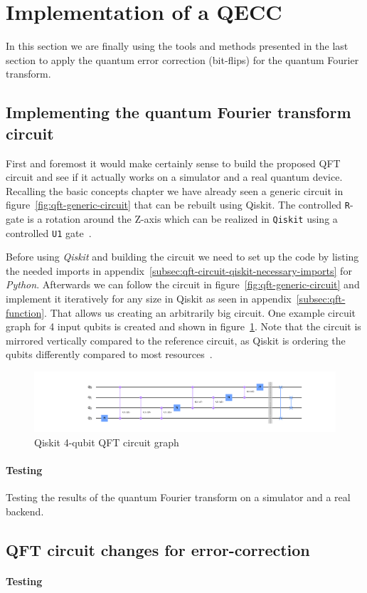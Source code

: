\section{Implementation of a QECC}
\label{sec:implementation}

In this section we are finally using the tools and methods presented in the last section to apply the quantum error correction (bit-flips) for the quantum Fourier transform.

\subsection{Implementing the quantum Fourier transform circuit}
\label{subsec:implementing-quantum-fourier-transform-circuit}

First and foremost it would make certainly sense to build the proposed QFT circuit and see if it actually works on a simulator and a real quantum device.
Recalling the basic concepts chapter we have already seen a generic circuit in figure~\ref{fig:qft-generic-circuit} that can be rebuilt using Qiskit.
The controlled \texttt{R}-gate is a rotation around the Z-axis which can be realized in \texttt{Qiskit} using a controlled \texttt{U1} gate~\cite{ControlledU1Gate}.

Before using \emph{Qiskit} and building the circuit we need to set up the code by listing the needed imports in appendix~\ref{subsec:qft-circuit-qiskit-necessary-imports} for \emph{Python}.
Afterwards we can follow the circuit in figure~\ref{fig:qft-generic-circuit} and implement it iteratively for any size in Qiskit as seen in appendix~\ref{subsec:qft-function}.
That allows us creating an arbitrarily big circuit.
One example circuit graph for 4 input qubits is created and shown in figure~\ref{fig:qft-4-qubit-circuit}.
Note that the circuit is mirrored vertically compared to the reference circuit, as Qiskit is ordering the qubits differently compared to most resources~\cite{QiskitGettingStarted}.

\begin{figure}[H]
    \centering
    \includegraphics[width=\textwidth]{res/qft-4-qubits-circuit.pdf}
    \caption{Qiskit 4-qubit QFT circuit graph}
    \label{fig:qft-4-qubit-circuit}
\end{figure}

\paragraph{Testing}

Testing the results of the quantum Fourier transform on a simulator and a real backend.

\subsection{QFT circuit changes for error-correction}
\label{subsec:qft-circuit-error-correction}

\paragraph{Testing}

